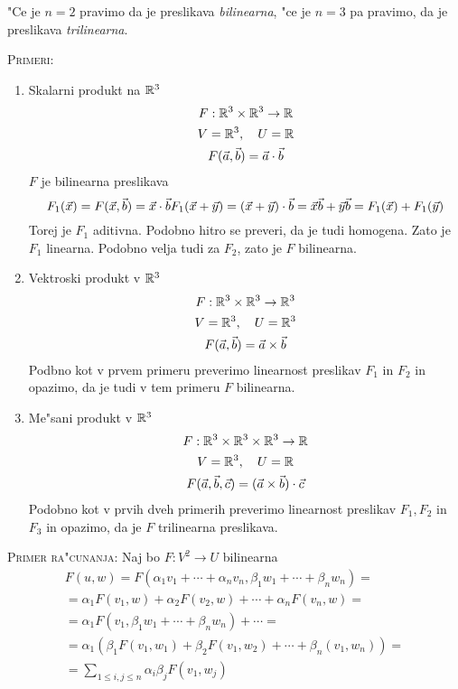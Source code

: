 "Ce je $n = 2$ pravimo da je preslikava \emph{bilinearna}, "ce je $n=3$ pa pravimo, da je preslikava \emph{trilinearna}.

\textsc{Primeri:}
\begin{enumerate}[(1)]
	\item Skalarni produkt na $\mathbb{R}^3$
	\begin{gather*}
	F: \mathbb{R}^3 \times \mathbb{R}^3 \to \mathbb{R} \\
	V = \mathbb{R}^3, \quad U= \mathbb{R} \\
	F(\vec{a}, \vec{b}) = \vec{a} \cdot \vec{b}
	\end{gather*}
	$F$ je bilinearna preslikava
	\begin{equation*}
	F_1(\vec{x}) = F(\vec{x}, \vec{b}) = \vec{x} \cdot \vec{b} \\
	F_1(\vec{x} + \vec{y}) = (\vec{x} + \vec{y}) \cdot \vec{b} = \vec{x} \vec{b} + \vec{y} \vec{b} = F_1(\vec{x}) + F_1(\vec{y})
	\end{equation*}
	Torej je $F_1$ aditivna. Podobno hitro se preveri, da je tudi homogena. Zato je $F_1$ linearna. Podobno velja tudi za $F_2$, zato je $F$ bilinearna.
	
	\item Vektroski produkt v $\mathbb{R}^3$
	\begin{gather*}
	F: \mathbb{R}^3 \times \mathbb{R}^3 \to \mathbb{R}^3 \\
	V = \mathbb{R}^3, \quad U = \mathbb{R}^3 \\
	F(\vec{a}, \vec{b}) = \vec{a} \times \vec{b}
	\end{gather*}
	Podbno kot v prvem primeru preverimo linearnost preslikav $F_1$ in $F_2$ in opazimo, da je tudi v tem primeru $F$ bilinearna.
	
	\item Me"sani produkt v $\mathbb{R}^3$
	\begin{gather*}
	F: \mathbb{R}^3 \times \mathbb{R}^3 \times \mathbb{R}^3 \to \mathbb{R} \\
	V = \mathbb{R}^3, \quad U = \mathbb{R} \\
	F(\vec{a}, \vec{b}, \vec{c}) = (\vec{a} \times \vec{b}) \cdot \vec{c}
	\end{gather*}
	Podobno kot v prvih dveh primerih preverimo linearnost preslikav $F_1, F_2$ in $F_3$ in opazimo, da je $F$ trilinearna preslikava.
\end{enumerate}
\textsc{Primer ra"cunanja:} Naj bo $F: V^2 \to U$ bilinearna
\begin{multline*}
F(u, w) = F(\alpha_1 v_1 + \cdots + \alpha_n v_n, \beta_1 w_1 + \cdots + \beta_n w_n) = \\
= \alpha_1 F(v_1, w) + \alpha_2 F(v_2, w) + \cdots + \alpha_n F(v_n, w) = \\
= \alpha_1 F(v_1, \beta_1 w_1 + \cdots + \beta_n w_n) + \cdots = \\
= \alpha_1 (\beta_1 F(v_1, w_1) + \beta_2 F(v_1, w_2) + \cdots + \beta_n (v_1, w_n)) = \\
= \sum_{1 \leq i, j \leq n} \alpha_i \beta_j F(v_1, w_j)
\end{multline*}
